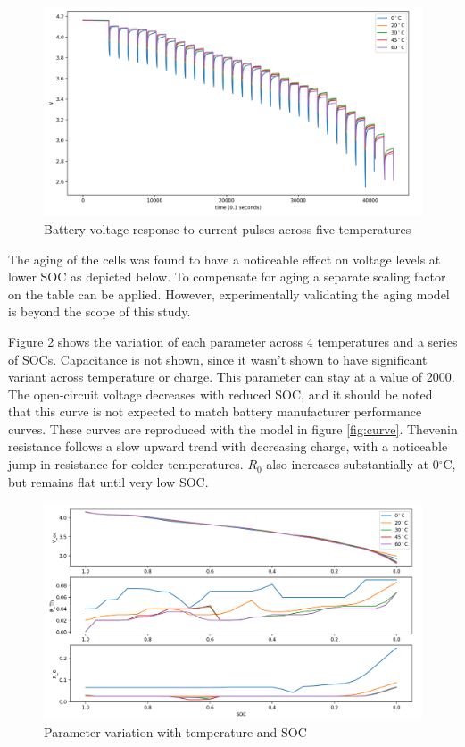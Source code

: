 \documentclass[]{aiaa-tc}%
\begin{document}
\begin{figure}[!htb]
	\centering
	\includegraphics[width=1.0\textwidth]{figures/All_Temp.png}
	\caption{Battery voltage response to current pulses across five temperatures}
	\label{fig:AllTemp}
\end{figure}



The aging of the cells was found to have a noticeable effect on voltage levels at lower SOC as depicted below. To compensate for aging a separate scaling factor on the table can be applied. However, experimentally validating the aging model is beyond the scope of this study.

Figure \ref{fig:Map} shows the variation of each parameter across 4 temperatures and a series of SOCs. Capacitance is not shown, since it wasn't shown to have significant variant across temperature or charge. This parameter can stay at a value of 2000. The open-circuit voltage decreases with reduced SOC, and it should be noted that this curve is not expected to match battery manufacturer performance curves. These curves are reproduced with the model in figure \ref{fig:curve}. Thevenin resistance follows a slow upward trend with decreasing charge, with a noticeable jump in resistance for colder temperatures. $R_0$ also increases substantially at 0$^\circ$C, but remains flat until very low SOC.

\begin{figure}[!htb]
	\centering
	\includegraphics[width=1.0\textwidth]{figures/maps.png}
	\caption{Parameter variation with temperature and SOC}
	\label{fig:Map}
\end{figure}
\end{document}
